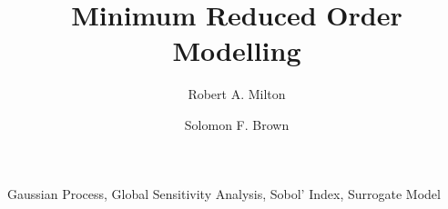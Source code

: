 \documentclass[preprint,12pt]{elsarticle}
\begin{document}
    \begin{frontmatter}



        \title{Minimum  Reduced Order Modelling}

        
        \author{Robert A. Milton}

        \author{Solomon F. Brown}

        \address{Department of Chemical and Biological Engineering, University of Sheffield, Sheffield, S1 3JD, United Kingdom}       

        \begin{abstract}

        \end{abstract}

        \begin{keyword}
            Gaussian Process, Global Sensitivity Analysis, Sobol' Index, Surrogate Model



        \end{keyword}

    \end{frontmatter}
\end{document}
